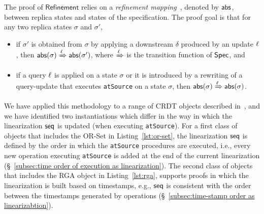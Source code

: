 The proof of $\mathsf{Refinement}$ relies on a \emph{refinement mapping}~\cite{}, denoted by $\mathsf{abs}$, between replica states and states of the specification. The proof goal is that for any two replica states $\sigma$ and $\sigma'$,
\begin{itemize}
	\item if $\sigma'$ is obtained from $\sigma$ by applying a downstream $\delta$ produced by an update $\ell$, then $\mathsf{abs}(\sigma)\xRightarrow{\ensuremath{\ell}}\mathsf{abs}(\sigma')$, where $\xRightarrow{\ensuremath{\ell}}$ is the transition function of $\mathsf{Spec}$, and
	\item if a query $\ell$ is applied on a state $\sigma$ or it is introduced by a rewriting of a query-update that executes {\tt atSource} on a state $\sigma$, then $\mathsf{abs}(\sigma)\xRightarrow{\ensuremath{\ell}}\mathsf{abs}(\sigma)$.
\end{itemize}


We have applied this methodology to a range of CRDT objects described in~\cite{}, and we have identified two instantiations which differ in the way in which the linearization $\mathsf{seq}$ is updated (when executing {\tt atSource}). For a first class of objects that includes the OR-Set in Listing~\ref{lst:or-set}, the linearization $\mathsf{seq}$ is defined by the order in which the {\tt atSource} procedures are executed, i.e., every new operation executing {\tt atSource} is added at the end of the current linearization (\S~\ref{subsec:time order of execution as linearization}). 
The second class of objects that includes the RGA object in Listing~\ref{lst:rga}, supports \CRDTLinshort{} proofs in which the linearization is built based on timestamps, e.g., $\mathsf{seq}$ is consistent with the order between the timestamps generated by operations (\S~\ref{subsec:time-stamp order as linearizabtion}).


